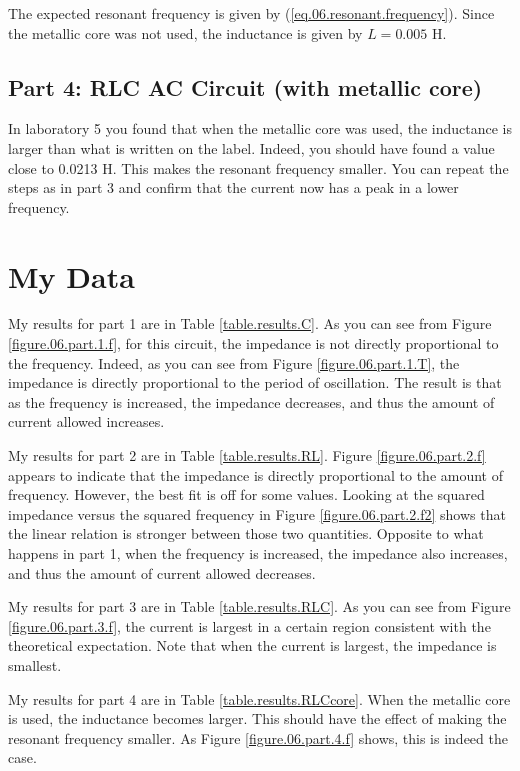 The expected resonant frequency is given by (\ref{eq.06.resonant.frequency}). Since the metallic core was not used, the inductance is given by $L = 0.005$ H.
%
\subsection{Part 4: RLC AC Circuit (with metallic core)}
%
In laboratory 5 you found that when the metallic core was used, the inductance is larger than what is written on the label. Indeed, you should have found a value close to 0.0213 H. This makes the resonant frequency smaller. You can repeat the steps as in part 3 and confirm that the current now has a peak in a lower frequency.
%
\section{My Data}
%
My results for part 1 are in Table \ref{table.results.C}. As you can see from Figure \ref{figure.06.part.1.f}, for this circuit, the impedance is not directly proportional to the frequency. Indeed, as you can see from Figure \ref{figure.06.part.1.T}, the impedance is directly proportional to the period of oscillation. The result is that as the frequency is increased, the impedance decreases, and thus the amount of current allowed increases.

My results for part 2 are in Table \ref{table.results.RL}. Figure \ref{figure.06.part.2.f} appears to indicate that the impedance is directly proportional to the amount of frequency. However, the best fit is off for some values. Looking at the squared impedance versus the squared frequency in Figure \ref{figure.06.part.2.f2} shows that the linear relation is stronger between those two quantities. Opposite to what happens in part 1, when the frequency is increased, the impedance also increases, and thus the amount of current allowed decreases.

My results for part 3 are in Table \ref{table.results.RLC}. As you can see from Figure \ref{figure.06.part.3.f}, the current is largest in a certain region consistent with the theoretical expectation. Note that when the current is largest, the impedance is smallest.

My results for part 4 are in Table \ref{table.results.RLCcore}. When the metallic core is used, the inductance becomes larger. This should have the effect of making the resonant frequency smaller. As Figure \ref{figure.06.part.4.f} shows, this is indeed the case.
